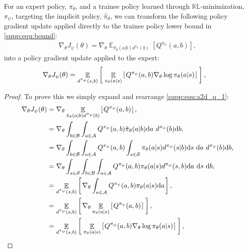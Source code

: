 \begin{lemma} 
For an expert policy, $\pi_{\theta}$, and a trainee policy learned through $\mathbb{KL}$-minimization, $\pi_{\psi}$, targeting the implicit policy, $\hat{\pi}_{\theta}$, we can transform the following policy gradient update applied directly to the trainee policy lower bound in \eqref{supp:equ:bound}:
\begin{align}
    \nabla_{\theta} J_{\psi}(\theta) =  \nabla_{\theta} \mathop{\mathbb{E}}_{{\hat{\pi}_\theta(a|b) d^{{\pi_{\psi}}}(b)}} \left[ Q^{{\pi_{\psi}}}(a,b) \right], \label{supp:equ:a2d_q_1}
\end{align}
into a policy gradient update applied to the expert:
\begin{align}
    \nabla_{\theta} J_{\psi}(\theta) &= \mathop{\mathbb{E}}_{d^{\pi_{\psi}}(s, b)} \left[ \hspace*{0.1em}{}  \mathop{\mathbb{E}}_{\pi_{\theta}(a | s)} \left[ \hspace*{0.1em}{}  Q^{\pi_{\psi}}(a,b)  \nabla_{\theta} \log \pi_{\theta}(a|s) \hspace*{0.1em} \right]{}  \hspace*{0.1em} \right]{} , 
\end{align}
\end{lemma}
\begin{proof}
To prove this we simply expand and rearrange \eqref{supp:equ:a2d_q_1}:
\begin{align}
    \nabla_{\theta} J_{\psi}(\theta) &= \nabla_{\theta} \mathop{\mathbb{E}}_{{\hat{\pi}_{\theta}(a|b) d^{{\pi_{\psi}}}(b)}} \lspsqb{}  Q^{\pi_{\psi}}(a,b) \rspsqb{} , \\%
    &= \nabla_{\theta} \int_{b\in\mathcal{B}} \int_{a\in\mathcal{A}} Q^{\pi_{\psi}}(a,b) \hat{\pi}_{\theta}(a | b) \d a \ d^{\pi_{\psi}}(b) \d b, \\%
    &= \nabla_{\theta} \int_{b\in\mathcal{B}} \int_{a\in\mathcal{A}} Q^{\pi_{\psi}}(a,b) \int_{s\in\mathcal{S}} \pi_{\theta}(a | s) d^{\pi_{\psi}}(s | b) \d s \ \d a \  d^{\pi_{\psi}}(b) \d b, \\%
    &= \nabla_{\theta} \int_{s\in\mathcal{S}} \int_{b\in\mathcal{B}} \int_{a\in\mathcal{A}} Q^{\pi_{\psi}}(a,b) \pi_{\theta}(a | s) d^{\pi_{\psi}}(s, b) \d a \ \d s \  \d b , \\%
    &= \mathop{\mathbb{E}}_{d^{\pi_{\psi}}(s, b)} \lspsqb{}  \nabla_{\theta} \int_{a\in\mathcal{A}} Q^{\pi_{\psi}}(a,b) \pi_{\theta}(a | s) \d a \rspsqb{} , \\ %
    &= \mathop{\mathbb{E}}_{d^{\pi_{\psi}}(s, b)} \lspsqb{}  \nabla_{\theta} \mathop{\mathbb{E}}_{\pi_{\theta}(a | s)} \lspsqb{}  Q^{\pi_{\psi}}(a,b) \rspsqb{}  \rspsqb{} , \\ %
    &= \mathop{\mathbb{E}}_{d^{\pi_{\psi}}(s, b)} \lspsqb{}  \mathop{\mathbb{E}}_{\pi_{\theta}(a | s)} \lspsqb{}  Q^{\pi_{\psi}}(a,b)  \nabla_{\theta} \log \pi_{\theta}(a|s) \rspsqb{}  \rspsqb{} , \label{supp:equ:aaaarrhhh}%
\end{align}
\end{proof}

